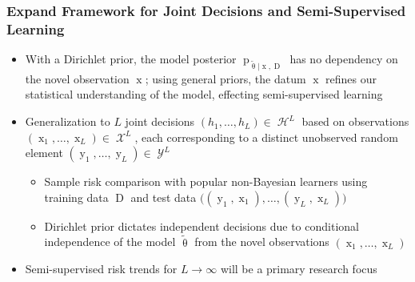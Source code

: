 \documentclass[aspectratio=169,usenames,dvipsnames]{beamer}
\DeclareMathOperator{\xrm}{\mathrm{x}}
\DeclareMathOperator{\yrm}{\mathrm{y}}
\DeclareMathOperator{\Drm}{\mathrm{D}}
\DeclareMathOperator{\prm}{\mathrm{p}}
\DeclareMathOperator{\Xcal}{\mathcal{X}}
\DeclareMathOperator{\Ycal}{\mathcal{Y}}
\DeclareMathOperator{\Hcal}{\mathcal{H}}
\begin{document}
\begin{frame}
\frametitle{Expand Framework for Joint Decisions and Semi-Supervised Learning}

\begin{itemize}
\item With a Dirichlet prior, the model posterior $\prm_{\tilde{\uptheta} | \xrm,\Drm}$ has no dependency on the novel observation $\xrm$; using general priors, the datum $\xrm$ refines our statistical understanding of the model, effecting \alert{semi-supervised} learning 
\vspace{0.5em}
\item Generalization to $L$ joint decisions $(h_1,\ldots,h_L) \in \Hcal^L$ based on observations $(\xrm_1,\ldots,\xrm_L) \in \Xcal^L$, each corresponding to a distinct unobserved random element $(\yrm_1,\ldots,\yrm_L) \in \Ycal^L$
\vspace{0.25em}
	\begin{itemize}
	\item \alert{Sample risk} comparison with popular non-Bayesian learners using training data $\Drm$ and test data $\big( (\yrm_1,\xrm_1),\ldots,(\yrm_L,\xrm_L)\big)$
	\vspace{0.25em}
	\item Dirichlet prior dictates \alert{independent decisions} due to conditional independence of the model $\tilde{\uptheta}$ from the novel observations $(\xrm_1,\ldots,\xrm_L)$
	\end{itemize}
\vspace{0.5em}
\item Semi-supervised risk trends for $L \to \infty$ will be a primary research focus
\end{itemize}

\end{frame}


%
\end{document}
